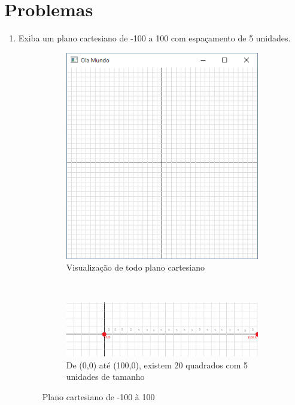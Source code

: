 \section*{Problemas}
\begin{enumerate}
\item
  Exiba um plano cartesiano de -100 a 100 com espaçamento de 5 unidades.
  \label{ex:cap01_ex1}

  \begin{figure}[!htb]
    \centering
    \begin{subfigure}[b]{0.3\textwidth}
        \centerline{\includegraphics[width=.9\textwidth]{img/cap1_ex1.png}}
        \caption{Visualização de todo plano cartesiano}
        \label{fig:cap01_ex1}
    \end{subfigure}
    ~
    \begin{subfigure}[b]{0.65\textwidth}
        \centerline{\includegraphics[width=.9\textwidth]{img/cap1_ex1_b.png}}
        \caption{De (0,0) até (100,0), existem 20 quadrados com 5 unidades de tamanho}
        \label{fig:cap01_ex1}
    \end{subfigure}
    \caption{Plano cartesiano de -100 à 100}
\end{figure}



\end{enumerate}
